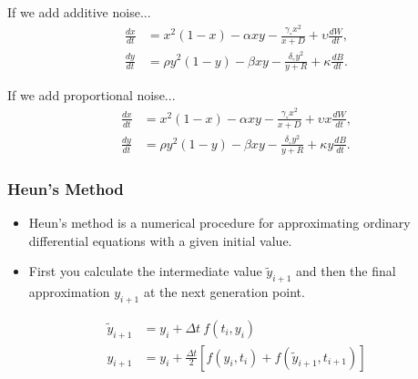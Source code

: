 \begin{frame}
		If we add additive noise... 
	\begin{align*}
		\frac{dx}{dt} &= x^2 (1-x) - \alpha xy - \frac{\gamma_\circ x^2}{x+D} + \upsilon \frac{dW}{dt}, \\
    \frac{dy}{dt} &= \rho y^2 (1-y) - \beta xy -\frac{\delta_\circ y^2}{y+R}+ \kappa \frac{dB}{dt}.
	\end{align*}
\end{frame}

\begin{frame}
		If we add proportional noise... 
	\begin{align*}
		\frac{dx}{dt} &= x^2 (1-x) - \alpha xy - \frac{\gamma_\circ x^2}{x+D} + \upsilon x \frac{dW}{dt}, \\
    \frac{dy}{dt} &= \rho y^2 (1-y) - \beta xy -\frac{\delta_\circ y^2}{y+R}+ \kappa y \frac{dB}{dt}.
	\end{align*}
\end{frame}




\begin{frame}
\frametitle{Heun's Method}
\begin{itemize}
\item Heun's method is a numerical procedure for approximating ordinary differential equations with a given initial value.
\item First you calculate the intermediate value $\tilde{y}_{i+1}$ and then the final approximation $y_{i+1}$ at the next generation point.
\end{itemize}

\begin{align*}
	\tilde{y}_{i+1} &= y_i + \Delta t \ f(t_i, y_i) \\
	y_{i+1} &= y_i + \frac{\Delta t}{2} \left[f(y_i,t_i) + f(\tilde{y}_{i+1}, t_{i+1})\right]
\end{align*}
\end{frame}


